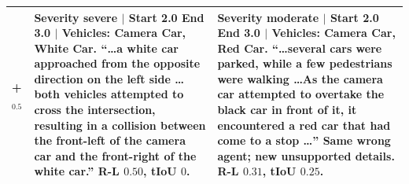 \begin{table}[!t]
\begin{tabular}{@{}p{1.5cm}p{}p{}@{}}
\\
\midrule
\textbf{\crashlogic{} + \tcd{}$_{0.5}$} &
Severity \textcolor{red!70!black}{severe} $|$ Start \textcolor{red!70!black}{2.0} End \textcolor{red!70!black}{3.0} $|$ Vehicles: Camera Car, White Car. ``\ldots a white car approached from the opposite direction on the left side \ldots both vehicles attempted to cross the intersection, resulting in a collision between the front-left of the camera car and the front-right of the white car.'' R-L $0.50$, tIoU $0$.
&
Severity moderate $|$ Start 2.0 End 3.0 $|$ Vehicles: Camera Car, \textcolor{red!70!black}{Red Car}. ``\ldots several cars were parked, while a few pedestrians were walking \ldots As the camera car attempted to overtake the black car in front of it, it encountered a \textcolor{red!70!black}{red car} that had come to a stop \ldots'' Same wrong agent; new unsupported details. R-L $0.31$, tIoU $0.25$.
\\
\bottomrule
\end{tabular}
\end{table}
